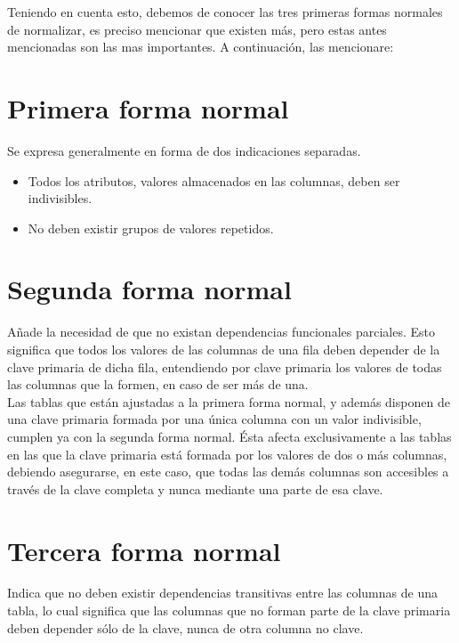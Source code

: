 \documentclass[a4paper,11pt]{article}
\theoremstyle{mytheor}
\begin{document}
Teniendo en cuenta esto, debemos de conocer las tres primeras formas normales de normalizar, es preciso mencionar que existen más, pero estas antes mencionadas son las mas importantes. A continuación, las mencionare:


\section*{Primera forma normal}

Se expresa generalmente en forma de dos indicaciones separadas.
\begin{itemize}
\item Todos los atributos, valores almacenados en las columnas, deben ser indivisibles.
\item No deben existir grupos de valores repetidos.
\end{itemize}

\section*{Segunda forma normal}

Añade la necesidad de que no existan dependencias funcionales parciales. Esto significa que todos los valores de las columnas de una fila deben depender de la clave primaria de dicha fila, entendiendo por clave primaria los valores de todas las columnas que la formen, en caso de ser más de una.\\

Las tablas que están ajustadas a la primera forma normal, y además disponen de una clave primaria formada por una única columna con un valor indivisible, cumplen ya con la segunda forma normal. Ésta afecta exclusivamente a las tablas en las que la clave primaria está formada por los valores de dos o más columnas, debiendo asegurarse, en este caso, que todas las demás columnas son accesibles a través de la clave completa y nunca mediante una parte de esa clave.


\section*{Tercera forma normal}

Indica que no deben existir dependencias transitivas entre las columnas de una tabla, lo cual significa que las columnas que no forman parte de la clave primaria deben depender sólo de la clave, nunca de otra columna no clave.
\end{document}
